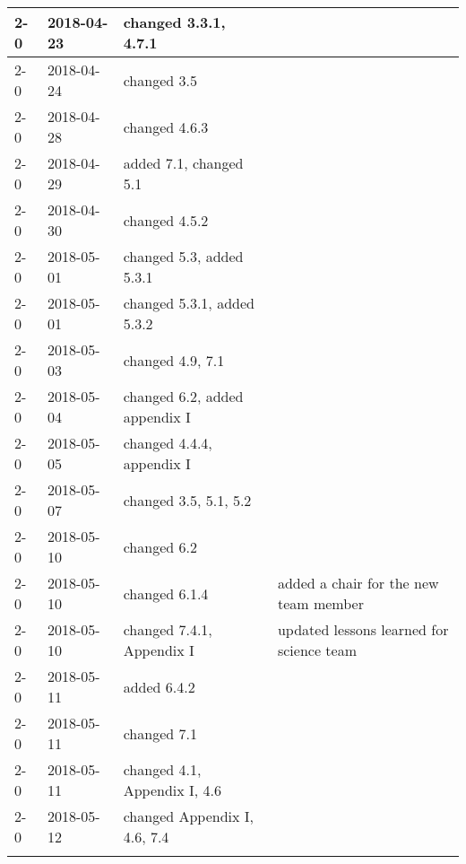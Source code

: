 \begin{longtable}{|p{}| p{} |p{} |p{}|}
    2-0     &   2018-04-23   & changed 3.3.1, 4.7.1 &\\\hline
    2-0     &   2018-04-24   & changed 3.5  & \\\hline
    2-0     &   2018-04-28   & changed 4.6.3 & \\\hline
    2-0     &   2018-04-29   & added 7.1, changed 5.1 &   \\\hline
    2-0     &   2018-04-30   & changed 4.5.2 &   \\\hline
    2-0     &   2018-05-01   & changed 5.3, added 5.3.1 &   \\\hline
    2-0     &   2018-05-01   & changed 5.3.1, added 5.3.2 &   \\\hline
    2-0     &   2018-05-03   & changed 4.9, 7.1 & \\\hline
    2-0     &   2018-05-04   & changed 6.2, added appendix I & \\\hline
    2-0     &   2018-05-05   & changed 4.4.4, appendix I & \\\hline
    2-0     &   2018-05-07   & changed 3.5, 5.1, 5.2 & \\\hline
    2-0     &   2018-05-10   & changed 6.2 & \\\hline
    2-0     &   2018-05-10   & changed 6.1.4 & added a chair for the new team member  \\\hline
    2-0     &   2018-05-10   & changed 7.4.1, Appendix I & updated lessons learned for science team  \\\hline
    2-0     &   2018-05-11   & added 6.4.2 &  \\\hline
    2-0     &   2018-05-11   & changed 7.1 &  \\\hline
    2-0     &   2018-05-11   & changed 4.1, Appendix I, 4.6 &  \\\hline
    2-0     &   2018-05-12   & changed Appendix I, 4.6, 7.4 & \\ \hline
    \label{COR}
\end{longtable}